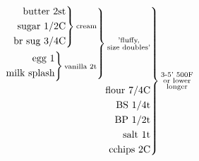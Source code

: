 \documentclass[12pt]{standalone}
\begin{document}
\[
\begin{rcases}\begin{alignedat}{3}
\begin{rcases}\begin{alignedat}{3}
\begin{rcases}\begin{alignedat}{3}
\text{butter 2st}\\
\text{sugar 1/2C}\\
\text{br sug 3/4C}\\
\end{alignedat}\end{rcases}
\substack{\text{cream}}\\
\begin{rcases}\begin{alignedat}{3}
\text{egg 1}\\
\text{milk splash}\\
\end{alignedat}\end{rcases}
\substack{\text{vanilla 2t}}\\
\end{alignedat}\end{rcases}
\substack{\text{'fluffy,}\\\text{size doubles'}}\\
\text{flour 7/4C}\\
\text{BS 1/4t}\\
\text{BP 1/2t}\\
\text{salt 1t}\\
\text{cchips 2C}\\
\end{alignedat}\end{rcases}
\substack{\text{3-5' 500F}\\\text{or lower}\\\text{longer}}\\
\]
\end{document}
